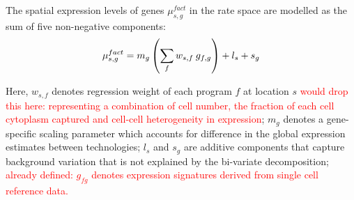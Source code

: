 \documentclass[11pt,a4paper]{article}
\newcommand{\red}{\textcolor{red}}
\begin{document}
The spatial expression levels of genes $\mu^{fact}_{s,g}$ in the rate space are modelled as the sum of five non-negative components:
\begin{equation} \label{eq:c2l:3}
\mu^{fact}_{s,g} = m_{g} \left (\sum_{f} {w_{s,f} \: g_{f,g}} \right) + l_s + s_{g}\\
\end{equation}

Here, $w_{s,f}$ denotes regression weight of each program $f$ at location $s$ 
\red{would drop this here:
representing a combination of cell number, the fraction of each cell cytoplasm captured and cell-cell heterogeneity in expression}; 
$m_{g}$ denotes a gene-specific scaling parameter which accounts for difference in the global expression estimates between technologies;
$l_{s}$ and $s_{g}$ are additive components that capture background variation that is not explained by the bi-variate decomposition;
\red{ already defined:
$g_{fg}$ denotes expression signatures derived from single cell reference data.}
\end{document}
